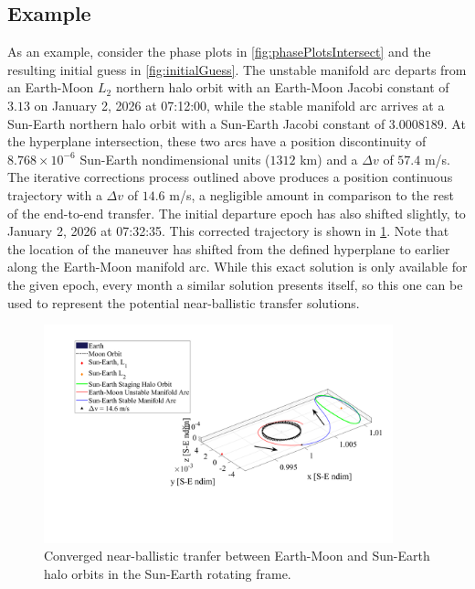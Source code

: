 \subsection{Example}
As an example, consider the phase plots in \cref{fig:phasePlotsIntersect} and the resulting initial
guess in \cref{fig:initialGuess}. The unstable manifold arc departs from an Earth-Moon $L_{2}$
northern halo orbit with an Earth-Moon Jacobi constant of $3.13$ on January 2, 2026 at 07:12:00,
while the stable manifold arc arrives at a Sun-Earth northern halo orbit with a Sun-Earth Jacobi
constant of $3.0008189$. At the hyperplane intersection, these two arcs have a position
discontinuity of $8.768\times10^{-6}$ Sun-Earth nondimensional units ($1312$ km) and a $\Delta v$
of $57.4$ m/s. The iterative corrections process outlined above produces a position continuous
trajectory with a $\Delta v$ of $14.6$ m/s, a negligible amount in comparison to the rest of the
end-to-end transfer. The initial departure epoch has also shifted slightly, to January 2, 2026 at
07:32:35. This corrected trajectory is shown in \cref{fig:solution}. Note that the location of the
maneuver has shifted from the defined hyperplane to earlier along the Earth-Moon manifold arc.
While this exact solution is only available for the given epoch, every month a similar solution
presents itself, so this one can be used to represent the potential near-ballistic transfer
solutions.

\begin{figure}[ht]
    \centering
    \includegraphics[width=0.9\textwidth]{figures/Solution.pdf}
    \caption{Converged near-ballistic tranfer between Earth-Moon and Sun-Earth halo orbits in the Sun-Earth rotating frame.}
    \label{fig:solution}
\end{figure}
